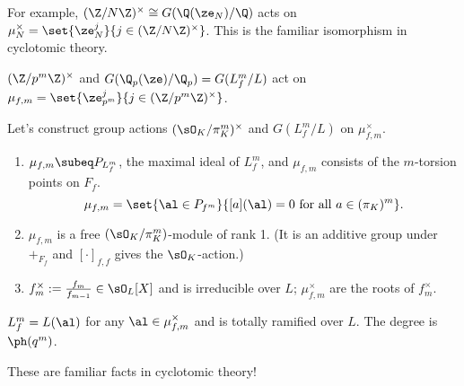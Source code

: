 For example, $(\Z/N\Z)^{\times}\cong G(\Q(\ze_N)/\Q)$ acts on $\mu_N^{\times}=\set{\ze_N^j}{j\in (\Z/N\Z)^{\times}}$. This is the familiar isomorphism in cyclotomic theory.
\begin{ex}
$(\Z/p^m\Z)^{\times}$ and $G(\Q_p(\ze)/\Q_p)=G(L_f^m/L)$ act on $\mu_{f,m}=\set{\ze_{p^m}^j}{j\in (\Z/p^m\Z)^{\times}}$.
\end{ex}
Let's construct group actions $(\sO_K/\pi_K^m)^{\times}$ and $G(L_f^m/L)$ on $\mu_{f,m}^{\times}$.
\begin{lem}
\begin{enumerate}
\item
$\mu_{f,m}\subeq P_{L_f^m}$, the maximal ideal of $L_f^m$, and $\mu_{f,m}$ consists of the $m$-torsion points on $F_f$.
\[
\mu_{f,m}=\set{\al\in P_{f^m}}{[a](\al)=0\text{ for all }a\in (\pi_K)^m}.
\]
\item
$\mu_{f,m}$ is a free $(\sO_K/\pi_K^m)$-module of rank 1. (It is an additive group under $+_{F_f}$ and $[\cdot]_{f,f}$ gives the $\sO_K$-action.)
\item
$f_m^{\times}:=\frac{f_m}{f_{m-1}}\in \sO_L[X]$ and is irreducible over $L$; $\mu_{f,m}^{\times}$ are the roots of $f_m^{\times}$.
\end{enumerate}
$L_f^m=L(\al)$ for any $\al\in \mu_{f,m}^{\times}$ and is totally ramified over $L$. The degree is $\ph(q^m)$.
\end{lem}
These are familiar facts in cyclotomic theory!
